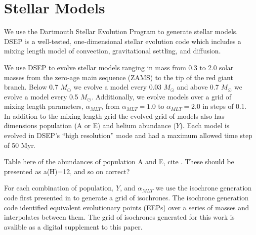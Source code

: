 \section{Stellar Models}\label{sec:modeling}
We use the Dartmouth Stellar Evolution Program \citep[DSEP, ][]{Dotter2008} to
generate stellar models. DSEP is a well-tested, one-dimensional stellar
evolution code which includes a mixing length model of convection,
gravitational settling, and diffusion.

We use DSEP to evolve stellar models ranging in mass from 0.3 to 2.0 solar
masses from the zero-age main sequence (ZAMS) to the tip of the red giant
branch. Below 0.7 $M_{\odot}$ we evolve a model every 0.03 $M_{\odot}$ and
above 0.7 $M_{\odot}$ we evolve a model every 0.5 $M_{\odot}$. Additionally, we
evolve models over a grid of mixing length parameters, $\alpha_{MLT}$, from
$\alpha_{MLT} = 1.0$ to $\alpha_{MLT} = 2.0$ in steps of 0.1. In addition to the
mixing length grid the evolved grid of models also has dimensions population (A
or E) and helium abundance ($Y$). Each model is evolved in DSEP's ``high
resolution'' mode and had a maximum allowed time step of 50 Myr. 

{\color{blue} Table here of the abundances of population A and E, cite \citep{Milone2015}. These should be presented as a(H)=12, and so on correct?}

For each combination of population, $Y$, and $\alpha_{MLT}$ we use the
isochrone generation code first presented in \citet{Dotter2016} to generate a
grid of isochrones. The isochrone generation code identified equivalent
evolutionary points (EEPs) over a series of masses and interpolates between
them. {\color{blue} The grid of isochrones generated for this work is avalible
as a digital supplement to this paper.}

